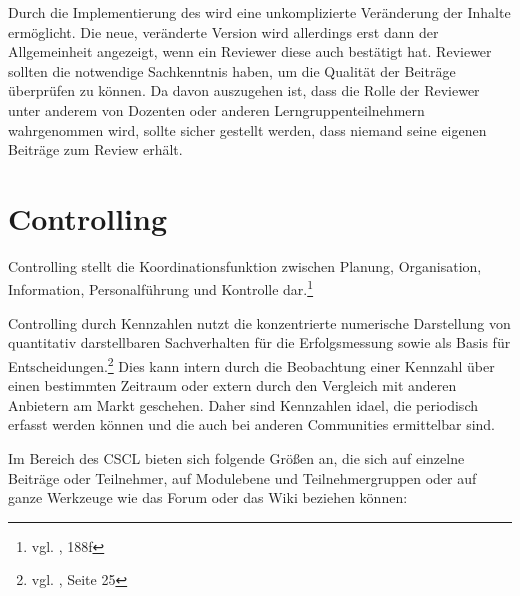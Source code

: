 Durch die Implementierung des  wird eine unkomplizierte Veränderung der Inhalte ermöglicht. Die neue, veränderte Version wird allerdings erst dann der Allgemeinheit angezeigt, wenn ein Reviewer diese auch bestätigt hat. Reviewer sollten die notwendige Sachkenntnis haben, um die Qualität der Beiträge überprüfen zu können.  Da davon auszugehen ist, dass die Rolle der Reviewer unter anderem von Dozenten oder anderen Lerngruppenteilnehmern wahrgenommen wird, sollte sicher gestellt werden, dass niemand seine eigenen Beiträge zum Review erhält.

\section{Controlling} %
\label{sec:controlling}

Controlling stellt die Koordinationsfunktion zwischen Planung, Organisation, Information, Personalführung und Kontrolle dar.\footnote{vgl. \cite{woehe}, 188f}

Controlling durch Kennzahlen nutzt die konzentrierte numerische Darstellung von quantitativ darstellbaren Sachverhalten für die Erfolgsmessung sowie als Basis für Entscheidungen.\footnote{vgl. \cite{reichmann}, Seite 25} Dies kann intern durch die Beobachtung einer Kennzahl über einen bestimmten Zeitraum oder extern durch den Vergleich mit anderen Anbietern am Markt geschehen. Daher sind Kennzahlen idael, die periodisch erfasst werden können und die auch bei anderen Communities ermittelbar sind.

Im Bereich des \ac{CSCL} bieten sich folgende Größen an, die sich auf einzelne Beiträge oder Teilnehmer, auf Modulebene und Teilnehmergruppen oder auf ganze Werkzeuge wie das Forum oder das Wiki beziehen können:

